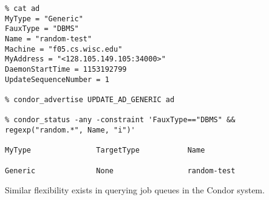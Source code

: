 \footnotesize
\begin{verbatim}
% cat ad
MyType = "Generic"
FauxType = "DBMS"
Name = "random-test"
Machine = "f05.cs.wisc.edu"
MyAddress = "<128.105.149.105:34000>"
DaemonStartTime = 1153192799
UpdateSequenceNumber = 1

% condor_advertise UPDATE_AD_GENERIC ad

% condor_status -any -constraint 'FauxType=="DBMS" && regexp("random.*", Name, "i")'

MyType               TargetType           Name                          

Generic              None                 random-test                   

\end{verbatim}
\normalsize

Similar flexibility exists in querying job queues in the Condor system.

